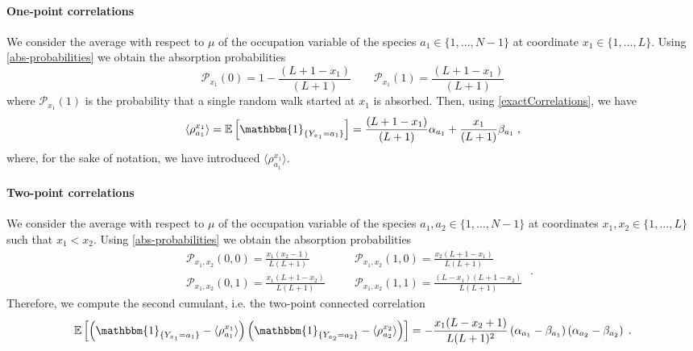 \documentclass[10pt]{article}
\numberwithin{equation}{section}
\numberwithin{equation}{subsection}
\newcommand{\co}{\;,}
\newcommand{\dt}{\;.}
\begin{document}
\paragraph{One-point correlations}
We consider the average with respect to $\mu$ of the occupation variable of the species $a_{1}\in \{1,\ldots,N-1\}$ at coordinate $x_{1}\in \{1,\ldots,L\}$. 
Using \eqref{abs-probabilities} we obtain the absorption probabilities 
\begin{equation}
	\mathcal{P}_{x_1}(0)=1-\frac{(L+1-x_{1})}{(L+1)}\qquad \mathcal{P}_{x_1}(1)=\frac{(L+1-x_{1})}{(L+1)}
\end{equation} 
where $\mathcal{P}_{x_1}(1)$ is the probability that a single random walk started at $x_1$ is absorbed. Then, using \eqref{exactCorrelations}, we have
\begin{equation}\label{one-pts-corr}
		\langle\rho_{a_{1}}^{x_{1}}\rangle= \mathbb{E}\left[\mathbbm{1}_{\{Y_{x_{1}}=a_{1}\}}\right]=\frac{(L+1-x_{1})}{(L+1)}\alpha_{a_{1}}+\frac{x_{1}}{(L+1)}\beta_{a_{1}}\co
\end{equation} 
{where, for the sake of notation, we have introduced $\langle\rho_{a_{1}}^{x_{1}}\rangle$.}
\paragraph{Two-point correlations}
We consider the average with respect to $\mu$ of the occupation variable of the species  $a_{1},a_{2}\in \{1,\ldots,N-1\}$ at coordinates $x_{1},x_{2}\in \{1,\ldots,L\}$ such that $x_{1}< x_{2}$. 
Using \eqref{abs-probabilities} we obtain the absorption probabilities
\begin{equation}
	\begin{split}
	&\mathcal{P}_{x_{1},x_{2}}(0,0)=\frac{x_{1}(x_{2}-1)}{L(L+1)}\\
	&\mathcal{P}_{x_{1},x_{2}}(0,1)=\frac{x_{1}(L+1-x_{2})}{L(L+1)}
\end{split}\quad \begin{split}
	&\mathcal{P}_{x_{1},x_{2}}(1,0)=\frac{x_{2}(L+1-x_{1})}{L(L+1)}\\
	&\mathcal{P}_{x_{1},x_{2}}(1,1)=\frac{(L-x_{1})(L+1-x_{2})}{L(L+1)}
	\end{split}\dt
\end{equation}
Therefore, we compute the second cumulant, i.e. the two-point connected correlation
\begin{equation}\label{two-pts-corr}
	\begin{split}
		 \mathbb{E}\left[\left(\mathbbm{1}_{\{Y_{x_{1}}=a_{1}\}}-\langle\rho_{a_{1}}^{x_{1}}\rangle \right)\left(\mathbbm{1}_{\{Y_{x_{2}}=a_{2}\}}-\langle\rho_{a_{2}}^{x_{2}}\rangle \right)\right]=-\frac{x_{1}(L-x_{2}+1)}{L(L+1)^{2}}\left(\alpha_{a_{1}}-\beta_{a_{1}}\right)\left(\alpha_{a_{2}}-\beta_{a_{2}}\right)\dt
	\end{split}
\end{equation} 
\end{document}
